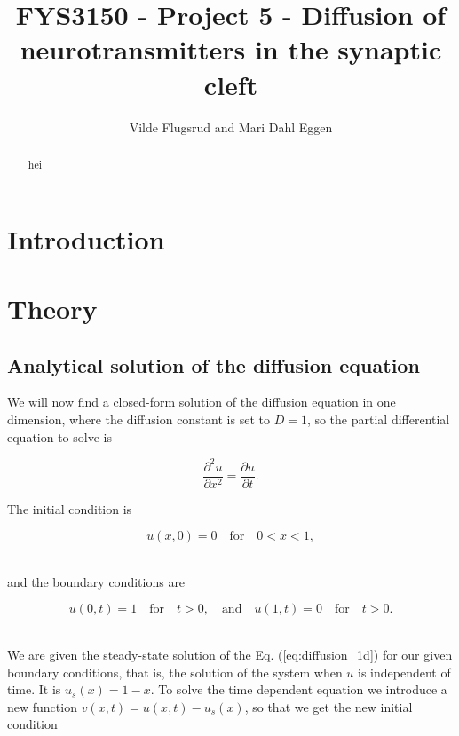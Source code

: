 \documentclass[12pt]{article}
\begin{document}
\title{FYS3150 - Project 5 - Diffusion of neurotransmitters in the synaptic cleft}
\author{Vilde Flugsrud and Mari Dahl Eggen}
\maketitle

\newpage

\tableofcontents

\newpage

\begin{flushleft}
\begin{abstract}
hei
\end{abstract}

\section{Introduction}

\section{Theory}
\subsection{Analytical solution of the diffusion equation\label{sect:analytical_solution}}
We will now find a closed-form solution of the diffusion equation in one dimension, where the diffusion constant is set to $D = 1$, so the partial differential equation to solve is 

\vspace{5mm}
\begin{equation}\label{eq:diffusion_1d}
\frac{\partial^2 u}{\partial x^2} = \frac{\partial u}{\partial t}.
\end{equation}
\vspace{5mm} 

The initial condition is 

\vspace{5mm}
$$u(x,0) = 0\quad\text{for}\quad 0<x<1,$$\\
\vspace{5mm}

and the boundary conditions are 

\vspace{5mm}
$$u(0,t) = 1\quad\text{for}\quad t>0,\quad\text{and}\quad u(1,t) = 0\quad\text{for}\quad t>0.$$\\
\vspace{5mm}

We are given the steady-state solution of the Eq. (\ref{eq:diffusion_1d}) for our given boundary conditions, that is, the solution of the system when $u$ is independent of time. It is $u_s(x) = 1-x$. To solve the time dependent equation we introduce a new function $v(x,t) = u(x,t) - u_s(x)$, so that we get the new initial condition 


\end{flushleft}
\end{document}
